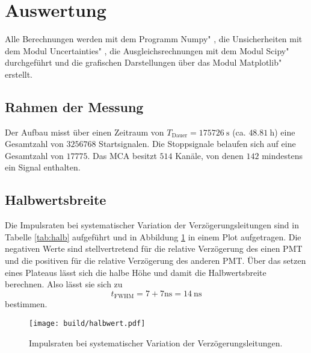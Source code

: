 \section{Auswertung}
\label{sec:Auswertung}
Alle Berechnungen werden mit dem Programm \glqq Numpy" \cite{numpy}, die Unsicherheiten mit dem Modul \glqq Uncertainties" \cite{uncertainties}, die Ausgleichsrechnungen mit dem Modul \glqq Scipy" \cite{scipy} durchgeführt und die grafischen Darstellungen über das Modul \glqq Matplotlib" \cite{matplotlib} erstellt.


\subsection{Rahmen der Messung}
Der Aufbau misst über einen Zeitraum von $T_\text{Dauer} = \SI{175726}{\s}$ (ca. $\SI{48.81}{\hour}$) eine Gesamtzahl von $\num{3256768}$ Startsignalen. Die Stoppsignale belaufen sich auf eine Gesamtzahl von $\num{17775}$. Das MCA besitzt $\num{514}$ Kanäle, von denen $\num{142}$ mindestens ein Signal enthalten.  


\subsection{Halbwertsbreite}

Die Impulsraten bei systematischer Variation der Verzögerungsleitungen sind in Tabelle \ref{tab:halb} aufgeführt und in Abbildung \ref{fig:halb} in einem Plot aufgetragen. Die negativen Werte sind stellvertretend für die relative Verzögerung des einen PMT und die positiven für die relative Verzögerung des anderen PMT. Über das setzen eines Plateaus lässt sich die halbe Höhe und damit die Halbwertsbreite berechnen.
Also lässt sie sich zu
\begin{equation}
    t_\text{FWHM} = 7+7 \si{\nano\s} = \SI{14}{\nano\s}
\end{equation}
bestimmen.


\begin{figure}[h]
    \centering
    \texttt{[image: build/halbwert.pdf]}
    \caption{Impulsraten bei systematischer Variation der Verzögerungsleitungen.}
    \label{fig:halb}
\end{figure}

